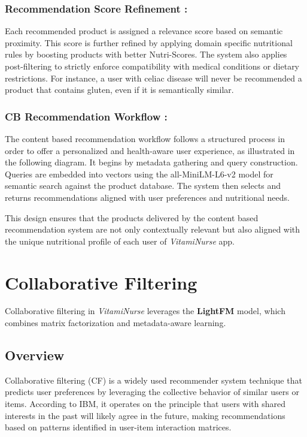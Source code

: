\subsubsection{Recommendation Score Refinement :}
\par Each recommended product is assigned a relevance score based on semantic proximity. This score is further refined by applying domain specific nutritional rules by boosting products with better Nutri-Scores. The system also applies post-filtering to strictly enforce compatibility with medical conditions or dietary restrictions. For instance, a user with celiac disease will never be recommended a product that contains gluten, even if it is semantically similar.

\subsubsection{CB Recommendation Workflow :}
The content based recommendation workflow follows a structured process in order to offer a personalized and health-aware user experience, as illustrated in the following diagram. It begins by metadata gathering and query construction. Queries are embedded into vectors using the all-MiniLM-L6-v2 model for semantic search against the product database. The system then selects and returns recommendations aligned with user preferences and nutritional needs.


\par This design ensures that the products delivered by the content based recommendation system are not only contextually relevant but also aligned with the unique nutritional profile of each user of \textit{VitamiNurse} app.

\vspace{0.4cm}
\section{Collaborative Filtering}
Collaborative filtering in \textit{VitamiNurse} leverages the \textbf{LightFM} model, which combines matrix factorization and metadata-aware learning. 
\subsection{Overview}

Collaborative filtering (CF) is a widely used recommender system technique that predicts user preferences by leveraging the collective behavior of similar users or items. According to IBM, it operates on the principle that users with shared interests in the past will likely agree in the future, making recommendations based on patterns identified in user-item interaction matrices\cite{ibmCF}.

